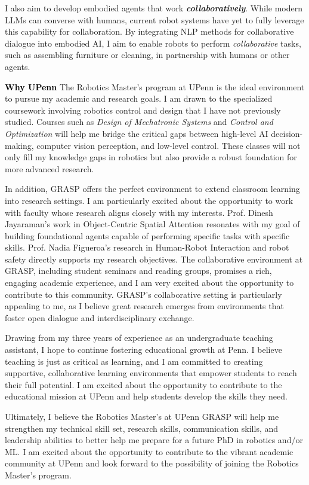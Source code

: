 \documentclass[11pt]{article}
\newcommand{\statement}[1]{\medskip\noindent
  \textcolor{black}{\textbf{#1}}\space
}
\begin{document}
\noindent I also aim to develop embodied agents that work \textbf{\textit{collaboratively}}. While modern LLMs can converse with humans, current robot systems have yet to fully leverage this capability for collaboration. By integrating NLP methods for collaborative dialogue into embodied AI, I aim to enable robots to perform \textit{collaborative} tasks, such as assembling furniture or cleaning, in partnership with humans or other agents.

\statement{Why UPenn} The Robotics Master's program at UPenn is the ideal environment to pursue my academic and research goals. I am drawn to the specialized coursework involving robotics control and design that I have not previously studied. Courses such as \textit{Design of Mechatronic Systems} and \textit{Control and Optimization} will help me bridge the critical gaps between high-level AI decision-making, computer vision perception, and low-level control. These classes will not only fill my knowledge gaps in robotics but also provide a robust foundation for more advanced research.

\noindent In addition, GRASP offers the perfect environment to extend classroom learning into research settings. I am particularly excited about the opportunity to work with faculty whose research aligns closely with my interests. Prof. Dinesh Jayaraman's work in Object-Centric Spatial Attention resonates with my goal of building foundational agents capable of performing specific tasks with specific skills. Prof. Nadia Figueroa's research in Human-Robot Interaction and robot safety directly supports my research objectives. The collaborative environment at GRASP, including student seminars and reading groups, promises a rich, engaging academic experience, and I am very excited about the opportunity to contribute to this community. GRASP's collaborative setting is particularly appealing to me, as I believe great research emerges from environments that foster open dialogue and interdisciplinary exchange.

\noindent Drawing from my three years of experience as an undergraduate teaching assistant, I hope to continue fostering educational growth at Penn. I believe teaching is just as critical as learning, and I am committed to creating supportive, collaborative learning environments that empower students to reach their full potential. I am excited about the opportunity to contribute to the educational mission at UPenn and help students develop the skills they need.

\noindent Ultimately, I believe the Robotics Master's at UPenn GRASP will help me strengthen my technical skill set, research skills, communication skills, and leadership abilities to better help me prepare for a future PhD in robotics and/or ML. I am excited about the opportunity to contribute to the vibrant academic community at UPenn and look forward to the possibility of joining the Robotics Master's program.
\end{document}
